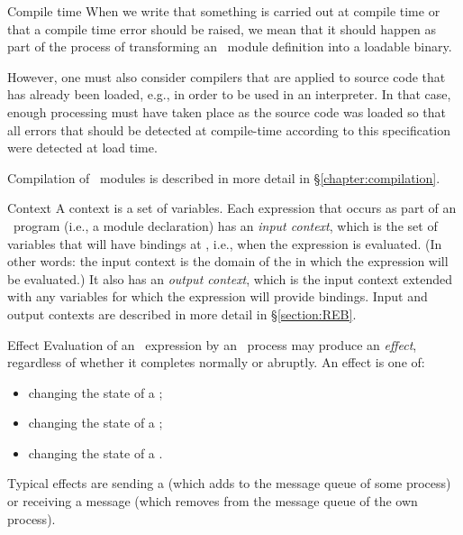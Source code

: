 \begin{Lentry}
\item[Compile time]
When we write that something is carried out at compile time or that a
compile time error should be raised, we mean that it should happen as
part of the process of transforming an \Erlang\ module definition into
a loadable binary.

However, one must also consider compilers that are applied to source
code that has already been loaded, e.g., in order to be used in an
interpreter.  In that case, enough processing must have taken place as
the source code was loaded so that all errors that should be detected
at compile-time according to this specification were detected at load
time.

Compilation of \Erlang\ modules is described in more detail in
\S\ref{chapter:compilation}.

\item[Context]
A context is a set of variables.  Each expression that occurs as part
of an \Erlang\ program (i.e., a module declaration) has an \emph{input
context}, which is the set of variables that will have bindings at
, i.e., when the expression is evaluated.  (In other
words: the input context is the domain of the  in which
the expression will be evaluated.)  It also has an \emph{output
context}, which is the input context extended with any variables for
which the expression will provide bindings.  Input and output contexts
are described in more detail in \S\ref{section:REB}.

\item[Effect]
Evaluation of an \Erlang\ expression by an \Erlang\ process
may produce an \emph{effect}, regardless of
whether it completes
normally or abruptly.  An effect is one of:
\begin{itemize}
\item changing the state of a ;
\item changing the state of a ;
\item changing the state of a .
\end{itemize}
Typical effects are sending a  (which adds to the message queue of some process)
or receiving a message (which removes from the message queue of the own process).


\end{Lentry}
